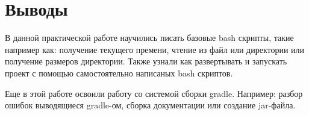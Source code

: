 \chapter*{Выводы}
В данной практической работе научились писать базовые bash скрипты, такие
например как: получение текущего премени, чтение из файл или директории или
получение размеров директории. Также узнали как развертывать и запускать
проект с помощью самостоятельно написаных bash скриптов.\par
Еще в этой работе освоили работу со системой сборки gradle.
Например: разбор ошибок выводящиеся gradle-ом, сборка документации или
создание jar-файла.

